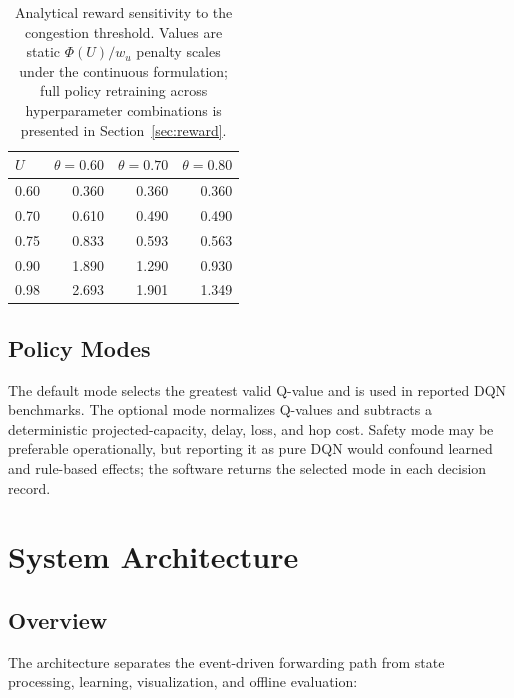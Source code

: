 \documentclass[12pt,a4paper,oneside]{report}
\newcommand{\code}[1]{\texttt{\seqsplit{#1}}}
\begin{document}
\begin{table}[htbp]
\centering
\caption{Analytical reward sensitivity to the congestion threshold. Values are static $\Phi(U)/w_u$ penalty scales under the continuous formulation; full policy retraining across hyperparameter combinations is presented in Section~\ref{sec:reward}.}
\label{tab:reward-sensitivity}
\begin{tabular}{lrrr}
\toprule
$U$ & $\theta=0.60$ & $\theta=0.70$ & $\theta=0.80$\\
\midrule
0.60 & 0.360 & 0.360 & 0.360\\
0.70 & 0.610 & 0.490 & 0.490\\
0.75 & 0.833 & 0.593 & 0.563\\
0.90 & 1.890 & 1.290 & 0.930\\
0.98 & 2.693 & 1.901 & 1.349\\
\bottomrule
\end{tabular}
\end{table}

\section{Policy Modes}
The default \code{pure} mode selects the greatest valid Q-value and is used in reported DQN benchmarks. The optional \code{safety} mode normalizes Q-values and subtracts a deterministic projected-capacity, delay, loss, and hop cost. Safety mode may be preferable operationally, but reporting it as pure DQN would confound learned and rule-based effects; the software returns the selected mode in each decision record.

\chapter{System Architecture}
\label{chap:architecture}

\section{Overview}
The architecture separates the event-driven forwarding path from state processing, learning, visualization, and offline evaluation:
\end{document}
